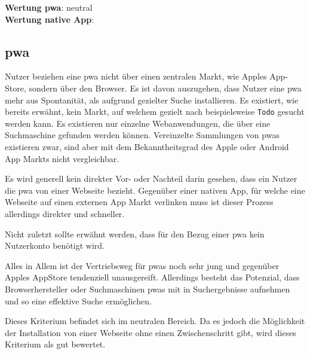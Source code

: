 \textbf{Wertung \ac{pwa}}: neutral\\
\textbf{Wertung native App}:  \\



\subsection{\ac{pwa}}
Nutzer beziehen eine \ac{pwa} nicht über einen zentralen Markt, wie Apples App-Store, sondern über den Browser. Es ist davon auszugehen, dass Nutzer eine \ac{pwa} mehr aus Spontanität, als aufgrund gezielter Suche installieren. Es existiert, wie bereits erwähnt, kein Markt, auf welchem gezielt nach beispielsweise \texttt{Todo} gesucht werden kann. Es existieren nur einzelne Webanwendungen, die über eine Suchmaschine gefunden werden können. Vereinzelte Sammlungen von \ac{pwa}s existieren zwar, sind aber mit dem Bekanntheitsgrad des Apple oder Android App Markts nicht vergleichbar.

Es wird generell kein direkter Vor- oder Nachteil darin gesehen, dass ein Nutzer die \ac{pwa} von einer Webseite bezieht. Gegenüber einer nativen App, für welche eine Webseite auf einen externen App Markt verlinken muss ist dieser Prozess allerdings direkter und schneller.

Nicht zuletzt sollte erwähnt werden, dass für den Bezug einer \ac{pwa} kein Nutzerkonto benötigt wird.

Alles in Allem ist der Vertriebsweg für \ac{pwa}s noch sehr jung und gegenüber Apples AppStore tendenziell unausgereift. Allerdings besteht das Potenzial, dass Browserhersteller oder Suchmaschinen \ac{pwa}s mit in Suchergebnisse aufnehmen und so eine effektive Suche ermöglichen.

Dieses Kriterium befindet sich im neutralen Bereich. Da es jedoch die Möglichkeit der Installation von einer Webseite ohne einen Zwischenschritt gibt, wird dieses Kriterium als gut bewertet.